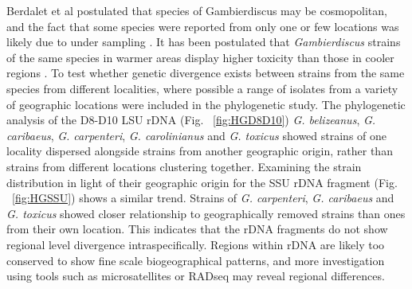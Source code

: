 \documentclass[12pt]{article}
\begin{document}
Berdalet et al postulated that species of Gambierdiscus may be cosmopolitan, and the fact that some species were reported from only one or few locations was likely due to under sampling \citep{litaker2010global}. It has been postulated that \textit{Gambierdiscus} strains of the same species  in warmer areas display higher toxicity than those in cooler regions \citep{bomber1989epiphytism}. To test whether genetic divergence exists between strains from the same species from different localities, where possible a range of isolates from a variety of geographic locations were included in the phylogenetic study. The phylogenetic analysis of the D8-D10 LSU rDNA (Fig. ~\ref{fig:HGD8D10})  \emph{G. belizeanus}, \emph{G. caribaeus}, \emph{G. carpenteri},  \emph{G. carolinianus} and \emph{G. toxicus} showed strains of one locality dispersed alongside strains from another geographic origin, rather than strains from different locations clustering together. Examining the strain distribution in light of their geographic origin for the SSU rDNA fragment (Fig. ~\ref{fig:HGSSU}) shows a similar trend. Strains of \emph{G. carpenteri}, \emph{G. caribaeus} and \emph{G. toxicus} showed closer relationship to geographically removed strains than ones from their own location.
This indicates that the rDNA fragments do not show regional level divergence intraspecifically. Regions within rDNA are likely too conserved to show fine scale biogeographical patterns, and more investigation using tools such as microsatellites or RADseq may reveal regional differences.
\end{document}
